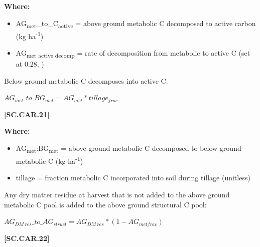         \textbf{Where:}
            
        \begin{itemize}
            \item AG\textsubscript{met}\_to\_C\textsubscript{active}	= above ground metabolic C decomposed to active carbon (kg ha\textsuperscript{-1})
            \item AG\textsubscript{met active decomp} = rate of decomposition from metabolic to active C (set at 0.28, \cite{parton1987analysis})
        \end{itemize}
        \vspace{0.5cm}

Below ground metabolic C decomposes into active C.
        \vspace{0.5cm}

    \begin{center}
\(AG_{met}\_to\_BG_{met}=AG_{met} * tillage_{frac}\)
    \end{center}
        \vspace{0.5cm} 
    
            {\raggedleft \textbf{[SC.CAR.21]}\par}
            \vspace{0.5cm}

        \textbf{Where:}
            
        \begin{itemize}
            \item AG\textsubscript{met}:BG\textsubscript{met} = above ground metabolic C decomposed to below ground metabolic C (kg ha\textsuperscript{-1})
            \item tillage = fraction metabolic C incorporated into soil during tillage (unitless)
        \end{itemize}
        \vspace{0.5cm}

Any dry matter residue at harvest that is not added to the above ground metabolic C pool is added to the above ground structural C pool:
        \vspace{0.5cm}

    \begin{center}
\(AG_{DM\ res}\_to\_AG_{struct} =AG_{DM\ res} * (1-AG_{met frac})	\)
    \end{center}
        \vspace{0.5cm} 
    
            {\raggedleft \textbf{[SC.CAR.22]}\par}
            \vspace{0.5cm}

